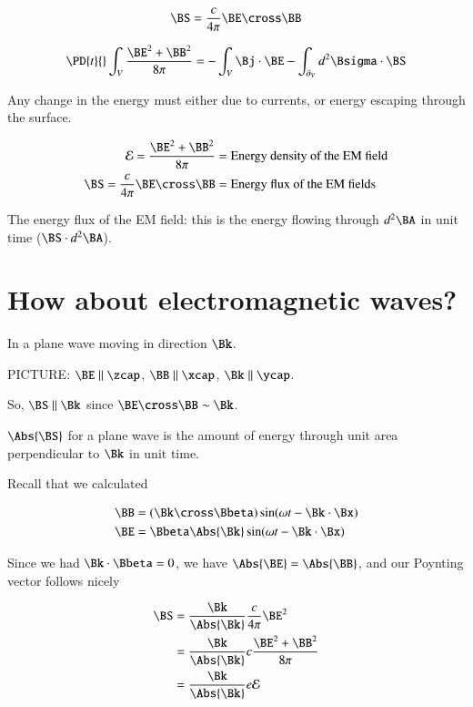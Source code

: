 \begin{equation}\label{eqn:relativisticElectrodynamicsL17:30}
\BS = \frac{c}{4 \pi} \BE \cross \BB
\end{equation}

\begin{equation}\label{eqn:relativisticElectrodynamicsL17:50}
\PD{t}{} \int_V \frac{\BE^2 + \BB^2 }{8 \pi} = - \int_V \Bj \cdot \BE - \int_{\partial_V} d^2 \Bsigma \cdot \BS
\end{equation}

Any change in the energy must either due to currents, or energy escaping through the surface.

\begin{align}\label{eqn:relativisticElectrodynamicsL17:70}
\mathcal{E} = \frac{\BE^2 + \BB^2 }{8 \pi} &= \mbox{Energy density of the EM field} \\
\BS = \frac{c}{4 \pi} \BE \cross \BB &= \mbox{Energy flux of the EM fields}
\end{align}

The energy flux of the EM field: this is the energy flowing through $d^2 \BA$ in unit time ($\BS \cdot d^2 \BA$).

\section{How about electromagnetic waves?}

In a plane wave moving in direction $\Bk$. 

PICTURE: $\BE \parallel \zcap$, $\BB \parallel \xcap$, $\Bk \parallel \ycap$.

So, $\BS \parallel \Bk$ since $\BE \cross \BB \sim \Bk$.

$\Abs{\BS}$ for a plane wave is the amount of energy through unit area perpendicular to $\Bk$ in unit time.

Recall that we calculated

\begin{align}\label{eqn:relativisticElectrodynamicsL17:90}
\BB &= (\Bk \cross \Bbeta) \sin(\omega t - \Bk \cdot \Bx) \\
\BE &= \Bbeta \Abs{\Bk} \sin(\omega t - \Bk \cdot \Bx)
\end{align}

Since we had $\Bk \cdot \Bbeta = 0$, we have $\Abs{\BE} = \Abs{\BB}$, and our Poynting vector follows nicely

\begin{align*}
\BS 
&= \frac{\Bk}{\Abs{\Bk}} \frac{c}{4 \pi} \BE^2  \\
&= \frac{\Bk}{\Abs{\Bk}} c \frac{\BE^2 + \BB^2}{8 \pi} \\
&= \frac{\Bk}{\Abs{\Bk}} e \mathcal{E}
\end{align*}

